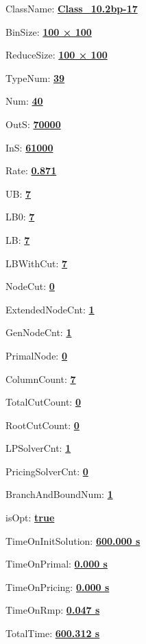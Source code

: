 \documentclass[11pt]{article}
\begin{document}
\pagestyle{empty}


ClassName: \underline{\textbf{Class_10.2bp-17}}
\par
BinSize: \underline{\textbf{100 × 100}}
\par
ReduceSize: \underline{\textbf{100 × 100}}
\par
TypeNum: \underline{\textbf{39}}
\par
Num: \underline{\textbf{40}}
\par
OutS: \underline{\textbf{70000}}
\par
InS: \underline{\textbf{61000}}
\par
Rate: \underline{\textbf{0.871}}
\par
UB: \underline{\textbf{7}}
\par
LB0: \underline{\textbf{7}}
\par
LB: \underline{\textbf{7}}
\par
LBWithCut: \underline{\textbf{7}}
\par
NodeCut: \underline{\textbf{0}}
\par
ExtendedNodeCnt: \underline{\textbf{1}}
\par
GenNodeCnt: \underline{\textbf{1}}
\par
PrimalNode: \underline{\textbf{0}}
\par
ColumnCount: \underline{\textbf{7}}
\par
TotalCutCount: \underline{\textbf{0}}
\par
RootCutCount: \underline{\textbf{0}}
\par
LPSolverCnt: \underline{\textbf{1}}
\par
PricingSolverCnt: \underline{\textbf{0}}
\par
BranchAndBoundNum: \underline{\textbf{1}}
\par
isOpt: \underline{\textbf{true}}
\par
TimeOnInitSolution: \underline{\textbf{600.000 s}}
\par
TimeOnPrimal: \underline{\textbf{0.000 s}}
\par
TimeOnPricing: \underline{\textbf{0.000 s}}
\par
TimeOnRmp: \underline{\textbf{0.047 s}}
\par
TotalTime: \underline{\textbf{600.312 s}}
\par
\newpage


\end{document}

